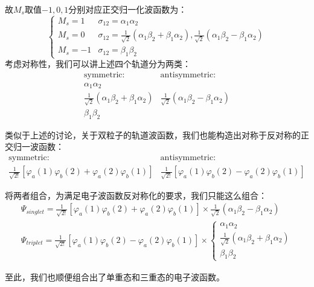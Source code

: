 故$M_s$取值$-1,0,1$分别对应正交归一化波函数为：
\[ 
    \left \{
    \begin{array}{ll}
        M_s=1  & \sigma_{12}=\alpha_1\alpha_2\\
        M_s=0  & \sigma_{12}=\frac{1}{\sqrt{2}}(\alpha_1\beta_2+\beta_1\alpha_2),\frac{1}{\sqrt{2}}(\alpha_1\beta_2-\beta_1\alpha_2)\\
        M_s=-1 & \sigma_{12}=\beta_1\beta_2
    \end{array}
    \right .
\]
考虑对称性，我们可以讲上述四个轨道分为两类：
\[ 
    \begin{array}{ll}
        \text{symmetric}: & \text{antisymmetric}: \\
         \alpha_1\alpha_2\\
         \frac{1}{\sqrt{2}}(\alpha_1\beta_2+\beta_1\alpha_2) & \frac{1}{\sqrt{2}}(\alpha_1\beta_2-\beta_1\alpha_2)\\
         \beta_1\beta_2
    \end{array}
\]

类似于上述的讨论，关于双粒子的轨道波函数，我们也能构造出对称于反对称的正交归一波函数：
\[
    \begin{array}{ll}
        \text{symmetric}: & \text{antisymmetric}: \\
        \frac{1}{\sqrt{2!}}[\varphi_a(1)\varphi_b(2)+\varphi_a(2)\varphi_b(1)] & \frac{1}{\sqrt{2!}}[\varphi_a(1)\varphi_b(2)-\varphi_a(2)\varphi_b(1)] 
    \end{array}
\]

将两者组合，为满足电子波函数反对称化的要求，我们只能这么组合：
\[
    \begin{array}{l}
        \varPsi_{singlet}=\frac{1}{\sqrt{2!}}[\varphi_a(1)\varphi_b(2)+\varphi_a(2)\varphi_b(1)]\times\frac{1}{\sqrt{2}}(\alpha_1\beta_2-\beta_1\alpha_2)\\
        \varPsi_{triplet}=\frac{1}{\sqrt{2!}}[\varphi_a(1)\varphi_b(2)-\varphi_a(2)\varphi_b(1)]\times \left \{
            \begin{array}{l}
                \alpha_1\alpha_2\\
                \frac{1}{\sqrt{2}}(\alpha_1\beta_2+\beta_1\alpha_2)\\
                \beta_1\beta_2
            \end{array}
        \right .
    \end{array}
\]

至此，我们也顺便组合出了单重态和三重态的电子波函数。

